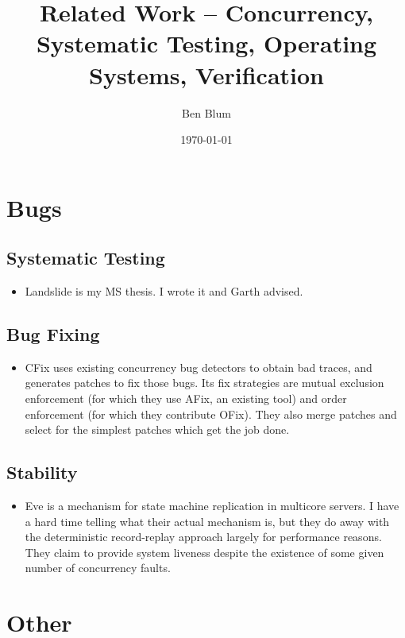 \documentclass{article}
\begin{document}

\title{Related Work -- Concurrency, Systematic Testing, Operating Systems, Verification}
\author{Ben Blum}
\date{\today}
\maketitle


\section{Bugs}

\subsection{Systematic Testing}
\begin{itemize}
	\item Landslide \cite{Landslide} is my MS thesis. I wrote it and Garth advised.
\end{itemize}

\subsection{Bug Fixing}
\begin{itemize}
	\item CFix \cite{cfix} uses existing concurrency bug detectors to obtain bad traces, and generates patches to fix those bugs. Its fix strategies are mutual exclusion enforcement (for which they use AFix, an existing tool) and order enforcement (for which they contribute OFix). They also merge patches and select for the simplest patches which get the job done.
\end{itemize}

\subsection{Stability}
\begin{itemize}
	\item Eve \cite{eve} is a mechanism for state machine replication in multicore servers. I have a hard time telling what their actual mechanism is, but they do away with the deterministic record-replay approach largely for performance reasons. They claim to provide system liveness despite the existence of some given number of concurrency faults.
\end{itemize}

\section{Other}


{}

\end{document}
